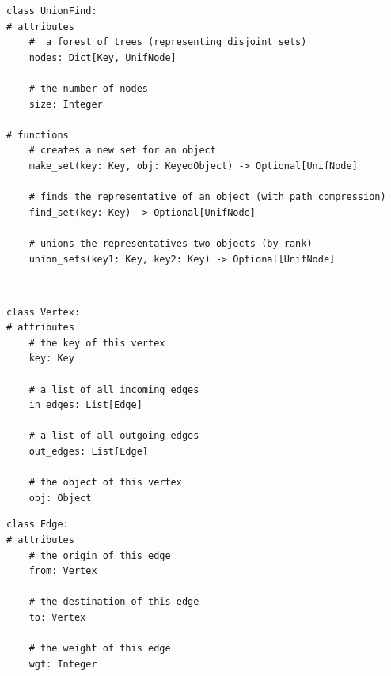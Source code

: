 \documentclass[mathserif, handout]{beamer}
\begin{document}
\begin{frame}[fragile]
  \vspace{-8mm}
  \begin{thmboxbot}
    \begin{lstlisting}[style=mypython]
class UnionFind:
# attributes
    #  a forest of trees (representing disjoint sets)
    nodes: Dict[Key, UnifNode]
    
    # the number of nodes
    size: Integer

# functions
    # creates a new set for an object
    make_set(key: Key, obj: KeyedObject) -> Optional[UnifNode]
    
    # finds the representative of an object (with path compression)
    find_set(key: Key) -> Optional[UnifNode]

    # unions the representatives two objects (by rank)
    union_sets(key1: Key, key2: Key) -> Optional[UnifNode]
\end{lstlisting}
  \end{thmboxbot}
\end{frame}


\begin{frame}[fragile]
  \begin{thmboxtop}
     \\
    \begin{lstlisting}[style=mypython]
class Vertex:
# attributes
    # the key of this vertex
    key: Key
    
    # a list of all incoming edges
    in_edges: List[Edge]

    # a list of all outgoing edges
    out_edges: List[Edge]

    # the object of this vertex
    obj: Object
\end{lstlisting}
  \end{thmboxtop}
\end{frame}

\begin{frame}[fragile]
  \begin{thmboxside}
    \begin{lstlisting}[style=mypython, firstnumber=last]
class Edge:
# attributes    
    # the origin of this edge
    from: Vertex
    
    # the destination of this edge
    to: Vertex
    
    # the weight of this edge
    wgt: Integer
\end{lstlisting}
  \end{thmboxside}
\end{frame}
\end{document}

